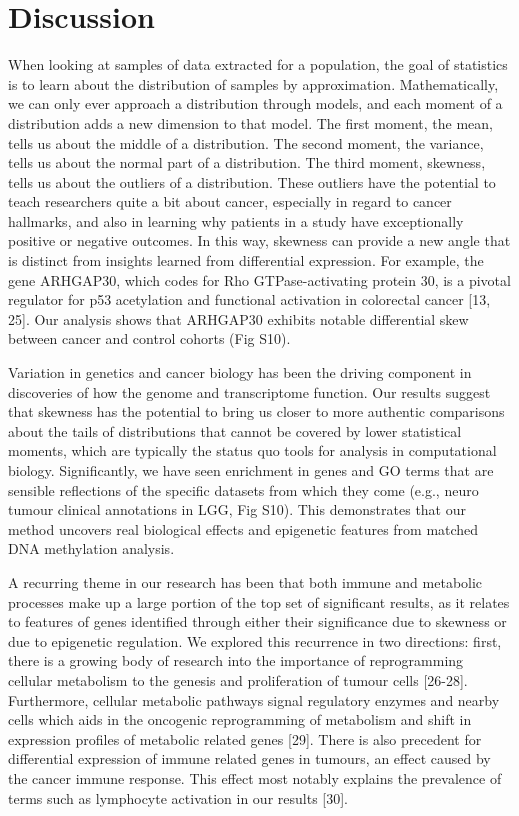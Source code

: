 \documentclass[11pt]{article}
\begin{document}
\section*{Discussion}

When looking at samples of data extracted for a population, the goal of statistics is to learn about the distribution of samples by approximation. Mathematically, we can only ever approach a distribution through models, and each moment of a distribution adds a new dimension to that model. The first moment, the mean, tells us about the middle of a distribution. The second moment, the variance, tells us about the normal part of a distribution. The third moment, skewness, tells us about the outliers of a distribution. These outliers have the potential to teach researchers quite a bit about cancer, especially in regard to cancer hallmarks, and also in learning why patients in a study have exceptionally positive or negative outcomes. In this way, skewness can provide a new angle that is distinct from insights learned from differential expression. For example, the gene ARHGAP30, which codes for Rho GTPase-activating protein 30, is a pivotal regulator for p53 acetylation and functional activation in colorectal cancer [13, 25]. Our analysis shows that ARHGAP30 exhibits notable differential skew between cancer and control cohorts (Fig S10).   
\newline

Variation in genetics and cancer biology has been the driving component in discoveries of how the genome and transcriptome function. Our results suggest that skewness has the potential to bring us closer to more authentic comparisons about the tails of distributions that cannot be covered by lower statistical moments, which are typically the status quo tools for analysis in computational biology. Significantly, we have seen enrichment in genes and GO terms that are sensible reflections of the specific datasets from which they come (e.g., neuro tumour clinical annotations in LGG, Fig S10). This demonstrates that our method uncovers real biological effects and epigenetic features from matched DNA methylation analysis.
\newline

A recurring theme in our research has been that both immune and metabolic processes make up a large portion of the top set of significant results, as it relates to features of genes identified through either their significance due to skewness or due to epigenetic regulation. We explored this recurrence in two directions: first, there is a growing body of research into the importance of reprogramming cellular metabolism to the genesis and proliferation of tumour cells [26-28]. Furthermore, cellular metabolic pathways signal regulatory enzymes and nearby cells which aids in the oncogenic reprogramming of metabolism and shift in expression profiles of metabolic related genes [29]. There is also precedent for differential expression of immune related genes in tumours, an effect caused by the cancer immune response. This effect most notably explains the prevalence of terms such as lymphocyte activation in our results [30]. 
\newline
\end{document}
